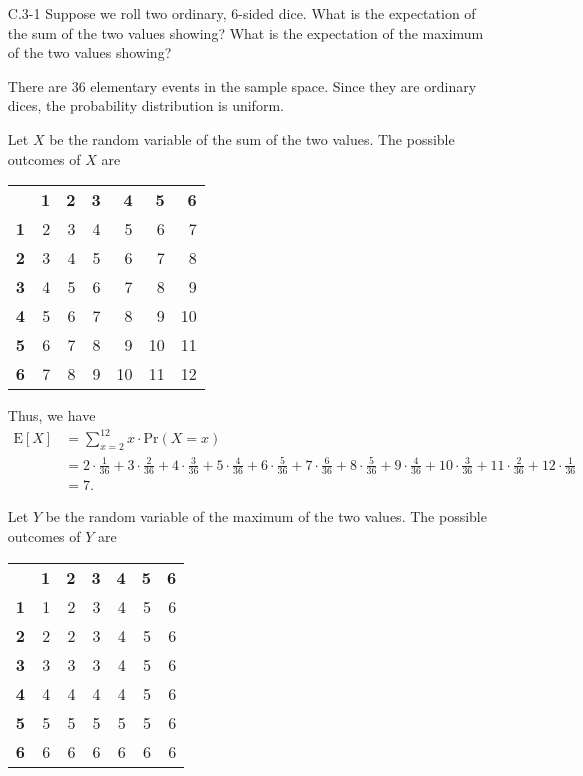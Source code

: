 \documentclass{report}
\makeatletter
\renewenvironment{framed}{%
 \def\FrameCommand##1{\hskip\@totalleftmargin
 \fboxsep=\FrameSep\fbox{##1}}%
 \MakeFramed {\advance\hsize-\width
   \@totalleftmargin\z@ \linewidth\hsize
   \@setminipage}}%
 {\par\unskip\endMakeFramed}
\makeatother
\begin{document}
\begin{enumerate}

\item[C.3{-}1]{Suppose we roll two ordinary, 6-sided dice. What is the
expectation of the sum of the two values showing? What is the expectation of
the maximum of the two values showing?}

\begin{framed}
There are $36$ elementary events in the sample space. Since they are
ordinary dices, the probability distribution is uniform.

Let $X$ be the random variable of the sum of the two values. The possible
outcomes of $X$ are
\begin{center}
\begin{tabular}{rrrrrrr}
  & \textbf{1} & \textbf{2} & \textbf{3} & \textbf{4} & \textbf{5} & \textbf{6}\\
  \textbf{1} & 2 & 3 & 4 & 5  & 6  & 7\\
  \textbf{2} & 3 & 4 & 5 & 6  & 7  & 8\\
  \textbf{3} & 4 & 5 & 6 & 7  & 8  & 9\\
  \textbf{4} & 5 & 6 & 7 & 8  & 9  & 10\\
  \textbf{5} & 6 & 7 & 8 & 9  & 10 & 11\\
  \textbf{6} & 7 & 8 & 9 & 10 & 11 & 12
\end{tabular}
\end{center}

Thus, we have
\begin{equation*}
\begin{aligned}
  \text{E}[X] &= \sum_{x = 2}^{12} x \cdot \text{Pr}(X = x)\\
              &= 2 \cdot \frac{1}{36} + 3 \cdot \frac{2}{36} + 4 \cdot \frac{3}{36} + 5 \cdot \frac{4}{36}
               + 6 \cdot \frac{5}{36} + 7 \cdot \frac{6}{36} + 8 \cdot \frac{5}{36} + 9 \cdot \frac{4}{36}
               + 10 \cdot \frac{3}{36} + 11 \cdot \frac{2}{36} + 12 \cdot \frac{1}{36}\\
              &= 7.
\end{aligned}
\end{equation*}

Let $Y$ be the random variable of the maximum of the two values. The possible
outcomes of $Y$ are

\begin{center}
\begin{tabular}{rrrrrrr}
  & \textbf{1} & \textbf{2} & \textbf{3} & \textbf{4} & \textbf{5} & \textbf{6}\\
  \textbf{1} & 1 & 2 & 3 & 4 & 5 & 6\\
  \textbf{2} & 2 & 2 & 3 & 4 & 5 & 6\\
  \textbf{3} & 3 & 3 & 3 & 4 & 5 & 6\\
  \textbf{4} & 4 & 4 & 4 & 4 & 5 & 6\\
  \textbf{5} & 5 & 5 & 5 & 5 & 5 & 6\\
  \textbf{6} & 6 & 6 & 6 & 6 & 6 & 6
\end{tabular}
\end{center}


\end{framed}
\end{enumerate}
\end{document}
